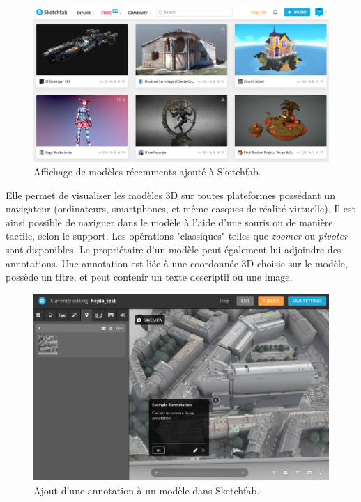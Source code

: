 \begin{figure}
    \centering
    \includegraphics[width=\linewidth]{Figures/sketchfab-overview.png}
    \caption{Affichage de modèles récemments ajouté à Sketchfab.}
    \label{fig:sketchfab-overview}
\end{figure}

Elle permet de visualiser les modèles 3D sur toutes plateformes possédant un navigateur (ordinateurs, smartphones, et même casques de réalité virtuelle).
Il est ainsi possible de naviguer dans le modèle à l'aide d'une souris ou de manière tactile, selon le support. Les opérations "classiques" telles que \textit{zoomer} ou \textit{pivoter} sont disponibles.
Le propriétaire d'un modèle peut également lui adjoindre des annotations. Une annotation est liée à une coordonnée 3D choisie sur le modèle, possède un titre, et peut contenir un texte descriptif ou une image.

\begin{figure}[h]
    \centering
    \includegraphics[width=\linewidth]{Figures/sketchfab-annotation-example.png}
    \caption{Ajout d'une annotation à un modèle dans Sketchfab.}
    \label{fig:sketchfab-annotation-example}
\end{figure}


